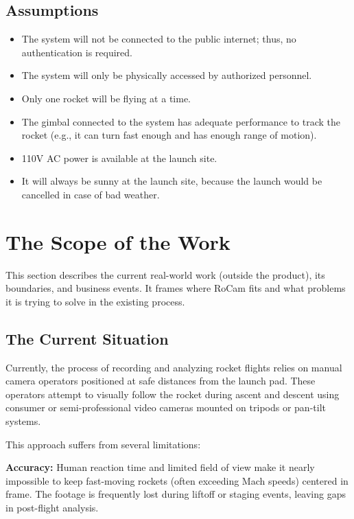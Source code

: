\documentclass[12pt]{article}
\begin{document}
\subsection{Assumptions}

\begin{itemize}[leftmargin=*]
  \item[AS-1] The system will not be connected to the public internet; thus, no
        authentication is required.
  \item[AS-2] The system will only be physically accessed by authorized personnel.
  \item[AS-3] Only one rocket will be flying at a time.
  \item[AS-4] The gimbal connected to the system has adequate performance to track the
        rocket (e.g., it can turn fast enough and has enough range of motion).
  \item[AS-5] 110V AC power is available at the launch site.
  \item[AS-6] It will always be sunny at the launch site, because the launch would be
        cancelled in case of bad weather.
\end{itemize}

\section{The Scope of the Work}
This section describes the current real-world work (outside the product), its
boundaries, and business events. It frames where RoCam fits and what problems
it is trying to solve in the existing process.

\subsection{The Current Situation}

Currently, the process of recording and analyzing rocket flights relies on
manual camera operators positioned at safe distances from the launch pad. These
operators attempt to visually follow the rocket during ascent and descent using
consumer or semi-professional video cameras mounted on tripods or pan-tilt
systems.

This approach suffers from several limitations:

\textbf{Accuracy:} Human reaction time and limited field of view make it nearly
impossible to keep fast-moving rockets (often exceeding Mach speeds) centered
in frame. The footage is frequently lost during liftoff or staging events,
leaving gaps in post-flight analysis.
\end{document}
